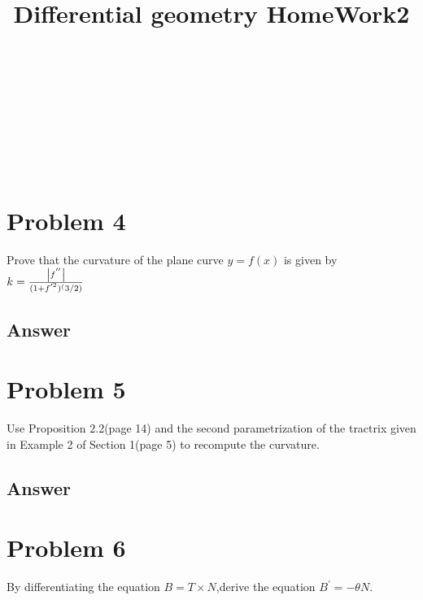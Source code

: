 \documentclass[
	12pt, %
]{fphw}
\title{Differential geometry HomeWork2}
\author{}
\theoremstyle{plain}
\begin{document}
\begin{center}
	\noindent{}\\[5pt]
\end{center}
\begin{center}
    \noindent{}\\[5pt]
\end{center}
‌‌‌‌\begin{center}
    \noindent{}\\[5pt]
\end{center}
\section*{Problem 4}
\begin{problem}
     Prove that the curvature of the plane curve \(y=f(x)\) is given by \(k=\frac{\abs{f^{''}}}{(1+f^{'^{2}})^(3/2)}\)
\end{problem}
\subsection*{Answer}

\section*{Problem 5}
\begin{problem}
     Use Proposition 2.2(page 14) and the second parametrization of the tractrix given in Example 2 of Section 1(page 5) to
      recompute the curvature.
\end{problem}
\subsection*{Answer}

\section*{Problem 6}
\begin{problem}
     By differentiating the equation \(B = T \times N\),derive the equation \(B^{'} = -\theta N\).
\end{problem}
\end{document}
